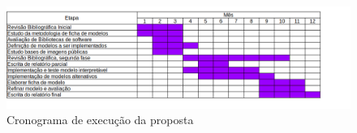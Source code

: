 \documentclass[12pt]{article}
\begin{document}
\begin{figure}[htb]
 \centering
 \includegraphics[width=1.0\textwidth]{images/crono2022}
 \caption{Cronograma de execução da proposta}
 \label{fig:crono}
\end{figure}

\bigskip


\end{document}
